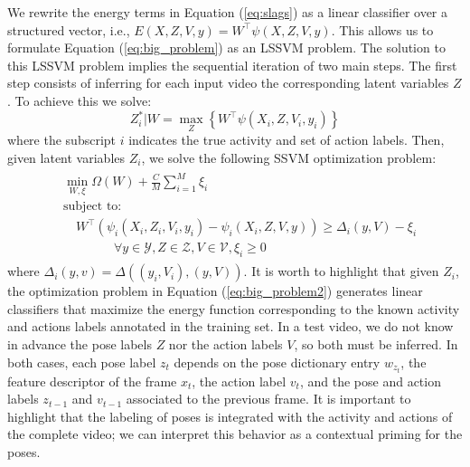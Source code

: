 We rewrite the energy terms in Equation (\ref{eq:slags}) as a linear classifier over a structured 
vector, i.e., $E(X,Z,V,y) = W^\top\psi(X,Z,V,y)$. This allows us to formulate Equation 
(\ref{eq:big_problem}) as an LSSVM problem. The solution to this LSSVM problem implies the 
sequential iteration of two main steps. The first step consists of inferring for each input 
video the corresponding latent variables $Z$. To achieve this we solve:
\begin{equation}
\label{eq:find_Z}
 Z_i^* | W= \max_{Z} \left\{ W^\top\psi(X_i,Z,V_i,y_i) \right \}
\end{equation}
where the subscript $i$ indicates the true activity and set of action labels.
Then, given latent variables $Z_i$, we solve the following SSVM optimization problem:
\begin{align}
\label{eq:big_problem2}
\begin{split}
& \min_{W, \xi}
      \Omega(W)
 + \frac{C}{M} \sum_{i=1}^M \xi_i \\
& \text{subject to:} \\
& \quad  W^\top(\psi_i(X_i, Z_i, V_i, y_i) - \psi_i(X_i, Z, V, y))  \geq \Delta_i( y, V) - \xi_i \\
   & \quad\quad\quad\quad \forall y \in \mathcal{Y}, Z \in \mathcal{Z},  V \in \mathcal{V}, \xi_i \ge 0
\end{split}
\end{align}
where $\Delta_i(y,v) = \Delta((y_i,V_i),(y,V))$. It is worth to highlight that given 
$Z_i$, the optimization problem in Equation (\ref{eq:big_problem2}) generates linear classifiers 
that maximize the energy function corresponding to the known activity and actions labels annotated
in the training set. In a test video, we do 
not know in advance the pose labels $Z$ nor the action labels $V$, so both must be inferred. In both 
cases, each pose label $z_t$ depends on the pose dictionary entry $w_{z_t}$, the feature descriptor of the 
frame $x_t$, the action label $v_t$, and the pose and action labels $z_{t-1}$ and $v_{t-1}$ 
associated to the previous frame. It is important to highlight that  the labeling of poses is 
integrated with the activity and actions of the complete video; we can interpret this behavior as a 
contextual priming for the poses.


